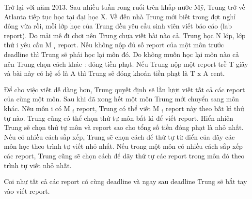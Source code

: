 Trở lại với năm 2013. Sau nhiều tuần rong ruổi trên khắp nước Mỹ, Trung trở về Atlanta tiếp tục học tại đại học X. Về đến nhà Trung mới biết trong đợt nghỉ đông vừa rồi, mỗi lớp học của Trung đều yêu cầu sinh viên viết báo cáo (lab report). Do mải mê đi chơi nên Trung chưa viết bài nào cả. Trung học N lớp, lớp thứ i yêu cầu M $_ i $ report. Nếu không nộp đủ số report của một môn trước deadline thì Trung sẽ phải học lại môn đó. Do không muốn học lại môn nào cả nên Trung chọn cách khác : đóng tiền phạt. Nếu Trung nộp một report trễ T giây và bài này có hệ số là A thì Trung sẽ đóng khoản tiền phạt là T x A cent.

Để cho việc viết dễ dàng hơn, Trung quyết định sẽ lần lượt viết tất cả các report của cùng một môn. Sau khi đã xong hết một môn Trung mới chuyển sang môn khác. Nếu môn i có M $_ i $ report, Trung có thể viết M $_ i $ report này theo bất kì thứ tự nào. Trung cũng có thể chọn thứ tự môn bất kì để viết report. Hiển nhiên Trung sẽ chọn thứ tự môn và report sao cho tổng số tiền đóng phạt là nhỏ nhất. Nếu có nhiều cách sắp xếp, Trung sẽ chọn cách để thứ tự từ điển của dãy các môn học theo trình tự viết nhỏ nhất. Nếu trong một môn có nhiều cách sắp xếp các report, Trung cũng sẽ chọn cách để dãy thứ tự các report trong môn đó theo trình tự viết nhỏ nhất.

Coi như tất cả các report có cùng deadline và ngay sau deadline Trung sẽ bắt tay vào viết report.

\
